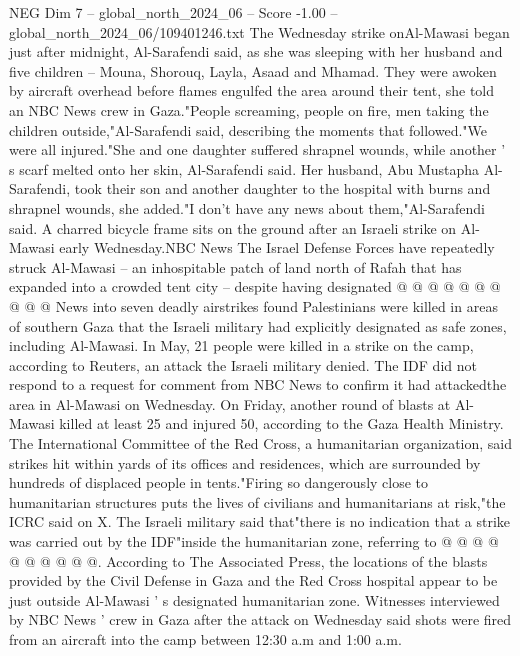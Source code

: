 \begin{textsample}{NEG Dim 7 – global\_north\_2024\_06 – Score -1.00 – global\_north\_2024\_06/109401246.txt}  \label{ex:f7_neg_366}
The Wednesday strike onAl-Mawasi began just after midnight, Al-Sarafendi said, as she was sleeping with her husband and five children -- Mouna, Shorouq, Layla, Asaad and Mhamad.
They were awoken by aircraft overhead before flames engulfed the area around their tent, she told an NBC News crew in Gaza."People screaming, people on fire, men taking the children outside,"Al-Sarafendi said, describing the moments that followed."We were all injured."She and one daughter suffered shrapnel wounds, while another ' s scarf melted onto her skin, Al-Sarafendi said.
Her husband, Abu Mustapha Al-Sarafendi, took their son and another daughter to the hospital with burns and shrapnel wounds, she added."I don't have any news about them,"Al-Sarafendi said.
A charred bicycle frame sits on the ground after an Israeli strike on Al-Mawasi early Wednesday.NBC News The Israel Defense Forces have repeatedly struck Al-Mawasi -- an inhospitable patch of land north of Rafah that has expanded into a crowded tent city -- despite having designated @ @ @ @ @ @ @ @ @ @ News into seven deadly airstrikes found Palestinians were killed in areas of southern Gaza that the Israeli military had explicitly designated as safe zones, including Al-Mawasi.
In May, 21 people were killed in a strike on the camp, according to Reuters, an attack the Israeli military denied.
The IDF did not respond to a request for comment from NBC News to confirm it had attackedthe area in Al-Mawasi on Wednesday.
On Friday, another round of blasts at Al-Mawasi killed at least 25 and injured 50, according to the Gaza Health Ministry.
The International Committee of the Red Cross, a humanitarian organization, said strikes hit within yards of its offices and residences, which are surrounded by hundreds of displaced people in tents."Firing so dangerously close to humanitarian structures puts the lives of civilians and humanitarians at risk,"the ICRC said on X.
The Israeli military said that"there is no indication that a strike was carried out by the IDF"inside the humanitarian zone, referring to @ @ @ @ @ @ @ @ @ @.
According to The Associated Press, the locations of the blasts provided by the Civil Defense in Gaza and the Red Cross hospital appear to be just outside Al-Mawasi ' s designated humanitarian zone.
Witnesses interviewed by NBC News ' crew in Gaza after the attack on Wednesday said shots were fired from an aircraft into the camp between 12:30 a.m and 1:00 a.m.

\end{textsample}
